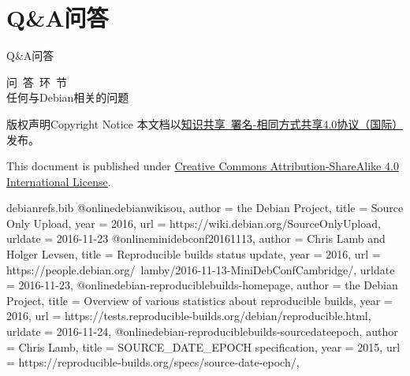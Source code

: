 \documentclass[aspectratio=169]{beamer}
\begin{document}

\section{Q&A问答}

\begin{frame}{Q\&A}{问答}
\begin{center}
{\Large 问~答~环~节}
\\
任何与Debian相关的问题
\end{center}
\end{frame}

\begin{frame}{版权声明}{Copyright Notice}
本文档以\href{https://creativecommons.org/licenses/by-sa/4.0/legalcode}{知识共享~署名-相同方式共享4.0协议（国际）}发布。
\vspace{1em}

This document is published under \href{https://creativecommons.org/licenses/by-sa/4.0/legalcode}{Creative Commons Attribution-ShareAlike 4.0 International License}.
\end{frame}

\begin{filecontents*}{debianrefs.bib}
@online{debianwikisou,
  author = {the Debian Project},
  title = {Source Only Upload},
  year = 2016,
  url = {https://wiki.debian.org/SourceOnlyUpload},
  urldate = {2016-11-23}
}
@online{minidebconf20161113,
  author = {Chris Lamb and
            Holger Levsen},
  title = {Reproducible builds status update},
  year = 2016,
  url = {https://people.debian.org/~lamby/2016-11-13-MiniDebConfCambridge/},
  urldate = {2016-11-23},
}
@online{debian-reproduciblebuilds-homepage,
  author = {the Debian Project},
  title = {Overview of various statistics about reproducible builds},
  year = 2016,
  url = {https://tests.reproducible-builds.org/debian/reproducible.html},
  urldate = {2016-11-24},
}
@online{debian-reproduciblebuilds-sourcedateepoch,
  author = {Chris Lamb},
  title = {SOURCE\_DATE\_EPOCH specification},
  year = 2015,
  url = {https://reproducible-builds.org/specs/source-date-epoch/},
}
\end{filecontents*}

\end{document}
